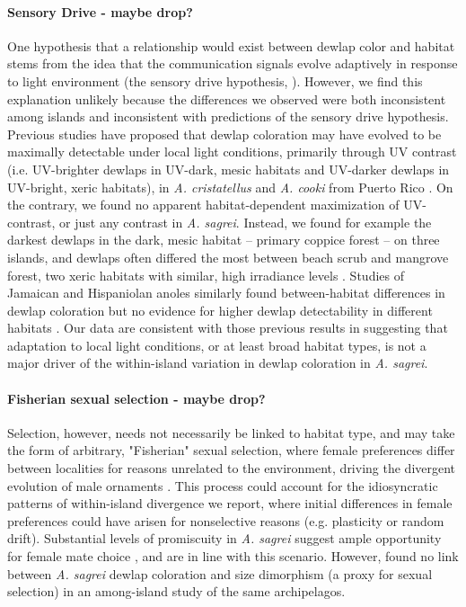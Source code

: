 \paragraph{Sensory Drive - maybe drop?} One hypothesis that a relationship would exist between dewlap color and habitat stems from the idea that the communication signals evolve adaptively in response to light environment (the sensory drive hypothesis, \citealt{Endler1988, Endler1992, Endler1998}). However, we find this explanation unlikely because the differences we observed were both inconsistent among islands and inconsistent with predictions of the sensory drive hypothesis. Previous studies have proposed that dewlap coloration may have evolved to be maximally detectable under local light conditions, primarily through UV contrast (i.e. UV-brighter dewlaps in UV-dark, mesic habitats and UV-darker dewlaps in UV-bright, xeric habitats), in \textit{ A. cristatellus} and \textit{A. cooki} from Puerto Rico \citep{Leal2002, Leal2004}. On the contrary, we found no apparent habitat-dependent maximization of UV-contrast, or just any contrast in \textit{ A. sagrei}. Instead, we found for example the darkest dewlaps in the dark, mesic habitat -- primary coppice forest -- on three islands, and dewlaps often differed the most between beach scrub and mangrove forest, two xeric habitats with similar, high irradiance levels \citep{Howard1950, Schoener1968}. Studies of Jamaican and Hispaniolan anoles similarly found between-habitat differences in dewlap coloration but no evidence for higher dewlap detectability in different habitats \citep{Fleishman2009, Ng2012}. Our data are consistent with those previous results in suggesting that adaptation to local light conditions, or at least broad habitat types, is not a major driver of the within-island variation in dewlap coloration in \textit{A. sagrei}.

\paragraph{Fisherian sexual selection - maybe drop?} Selection, however, needs not necessarily be linked to habitat type, and may take the form of arbitrary, "Fisherian" sexual selection, where female preferences differ between localities for reasons unrelated to the environment, driving the divergent evolution of male ornaments \citep{Lande1981, Andersson1994, Higashi1999}. This process could account for the idiosyncratic patterns of within-island divergence we report, where initial differences in female preferences could have arisen for nonselective reasons (e.g. plasticity or random drift). Substantial levels of promiscuity in \textit{A. sagrei} suggest ample opportunity for female mate choice \citep{Kamath2018}, and are in line with this scenario. However, \citep{Baeckens2018} found no link between \textit{A. sagrei} dewlap coloration and size dimorphism (a proxy for sexual selection) in an among-island study of the same archipelagos.

